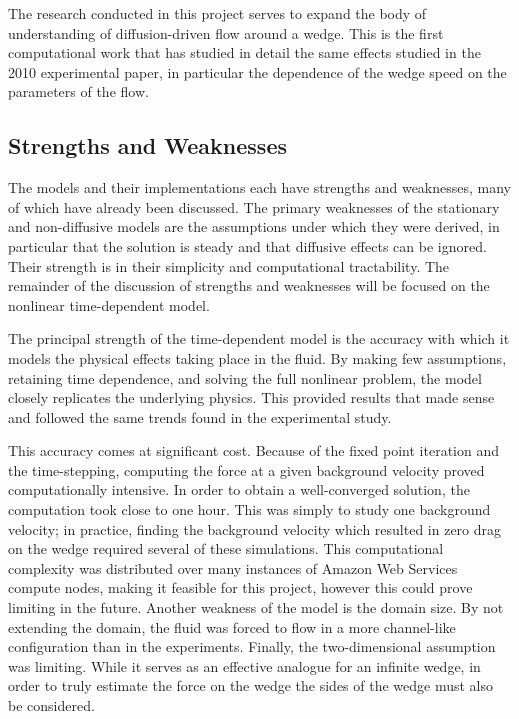 \documentclass[12pt]{article}
\begin{document}
The research conducted in this project serves to expand the body of understanding of diffusion-driven flow around a wedge. This is the first computational work that has studied in detail the same effects studied in the 2010 experimental paper, in particular the dependence of the wedge speed on the parameters of the flow.

\subsection{Strengths and Weaknesses}

The models and their implementations each have strengths and weaknesses, many of which have already been discussed. The primary weaknesses of the stationary and non-diffusive models are the assumptions under which they were derived, in particular that the solution is steady and that diffusive effects can be ignored. Their strength is in their simplicity and computational tractability. The remainder of the discussion of strengths and weaknesses will be focused on the nonlinear time-dependent model.

The principal strength of the time-dependent model is the accuracy with which it models the physical effects taking place in the fluid. By making few assumptions, retaining time dependence, and solving the full nonlinear problem, the model closely replicates the underlying physics. This provided results that made sense and followed the same trends found in the experimental study.

This accuracy comes at significant cost. Because of the fixed point iteration and the time-stepping, computing the force at a given background velocity proved computationally intensive. In order to obtain a well-converged solution, the computation took close to one hour. This was simply to study one background velocity; in practice, finding the background velocity which resulted in zero drag on the wedge required several of these simulations. This computational complexity was distributed over many instances of Amazon Web Services compute nodes, making it feasible for this project, however this could prove limiting in the future. Another weakness of the model is the domain size. By not extending the domain, the fluid was forced to flow in a more channel-like configuration than in the experiments. Finally, the two-dimensional assumption was limiting. While it serves as an effective analogue for an infinite wedge, in order to truly estimate the force on the wedge the sides of the wedge must also be considered.
\end{document}
